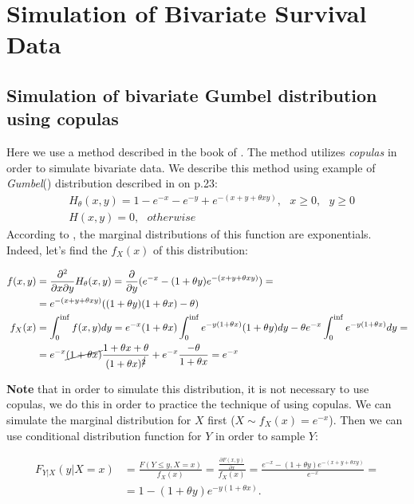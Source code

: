 \documentclass[]{article}
\begin{document}
\section{Simulation of Bivariate Survival Data}

\subsection{Simulation of bivariate Gumbel distribution using copulas}

Here we use a method described in the book of \cite{nelsen2007introduction}. The method utilizes \emph{copulas} in order to simulate bivariate data. We describe this method using example of \emph{Gumbel}(\cite{gumbel1960bivariate}) distribution described in \cite{nelsen2007introduction} on p.23:
	$$
	\begin{aligned}
    &H_{\theta}(x, y) = 1-e^{-x} - e^{-y} + e^{-(x+y+\theta xy)}, ~~~ x\geq 0, ~~~y\geq 0\\
    &H(x,y) = 0, ~~~otherwise
	\end{aligned}
	$$
According to \cite{nelsen2007introduction}, the marginal distributions of this function are exponentials. Indeed, let's find the $f_X(x)$ of this distribution:

$$
\begin{aligned}
    f(x,y) & = \frac{\partial^2}{\partial x \partial y}H_{\theta}(x, y) = \frac{\partial}{\partial y}(e^{-x} - (1+\theta y)e^{-(x+y+\theta xy)}) =\\
      & = e^{-(x+y+\theta xy)}((1+\theta y)(1+\theta x) - \theta)\\
    f_X(x) & = \int_0^{\inf} f(x,y)dy = e^{-x}(1 + \theta x)\int_0^{\inf}e^{-y(1+\theta x)} (1 + \theta y) dy  - \theta e^{-x} \int_0^{\inf} e^{-y(1+\theta x)} dy = \\
    & = e^{-x}\cancel{(1 + \theta x)} \frac{1+\theta x + \theta}{(1+\theta x)^{\cancel{2}}} + e^{-x}\frac{-\theta}{1 + \theta x} = e^{-x}
\end{aligned}
$$

\textbf{Note} that in order to simulate this distribution, it is not necessary to use copulas, we do this in order to practice the technique of using copulas. We can simulate the marginal distribution for $X$ first ($X \sim f_X(x) = e^{-x}$). Then we can use conditional distribution function for $Y$ in order to sample $Y$: 


$$
\begin{aligned}
F_{Y|X}(y|X=x) &= \frac{F(Y\leq y,X=x)}{f_X(x)}= \frac{\frac{\partial F(x,y)}{\partial x}}{f_X(x)} =\frac{ e^{-x} - (1+\theta y)e^{-(x+y+\theta xy)}}{e^{-x}} =\\
&= 1 - (1+\theta y)e^{-y(1+\theta x)}.
\end{aligned}
$$
\end{document}
